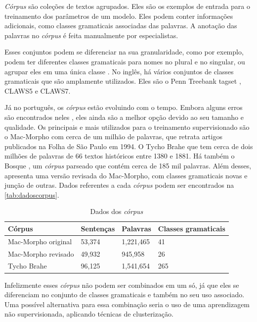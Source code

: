 \textit{Córpus} são coleções de textos agrupados. Eles são os exemplos de entrada para o treinamento dos parâmetros de um modelo. Eles podem conter informações adicionais, como classes gramaticais associadas das palavras. A anotação das palavras no \textit{córpus} é feita manualmente por especialistas.

Esses conjuntos podem se diferenciar na sua granularidade, como por exemplo, podem ter diferentes classes gramaticais para nomes no plural e no singular, ou agrupar eles em uma única classe \cite{fonseca2015evaluating}. No inglês, há vários conjuntos de classes gramaticais que são amplamente utilizados. Eles são o Penn Treebank tagset \cite{penntreebank}, CLAWS5 e CLAWS7.

Já no português, os \textit{córpus} estão evoluindo com o tempo. Embora alguns erros são encontrados neles \cite{fonseca2013mac}, eles ainda são a melhor opção devido ao seu tamanho e qualidade. Os principais e mais utilizados para o treinamento supervisionado são o Mac-Morpho \cite{aluisio2003account} com cerca de um milhão de palavras, que retrata artigos publicados na Folha de São Paulo em 1994. O Tycho Brahe \cite{tychobrahe2010corpus} que tem cerca de dois milhões de palavras de 66 textos históricos entre 1380 e 1881. Há também o Bosque \cite{afonso2002floresta}, um \textit{córpus} parseado que contém cerca de 185 mil palavras. Além desses, \cite{fonseca2015evaluating} apresenta uma versão revisada do Mac-Morpho, com classes gramaticais novas e junção de outras. Dados referentes a cada \textit{córpus} podem ser encontrados na \autoref{tab:dadoscorpus}.

\begin{table}[!htb]
\footnotesize
\centering
\caption{Dados dos \textit{córpus}}
\label{tab:dadoscorpus}
\begin{tabular}{m{4cm}m{2cm}m{2cm}m{4cm}}
  \toprule
  \textbf{Córpus} & \textbf{Sentenças}  & \textbf{Palavras}  & \textbf{Classes gramaticais}  \\
  \midrule
  Mac-Morpho original & 53,374 & 1,221,465 & 41  \\
  Mac-Morpho revisado & 49,932 & 945,958   & 26  \\
  Tycho Brahe         & 96,125 & 1,541,654 & 265 \\
  \bottomrule
\end{tabular}
\end{table}

Infelizmente esses \textit{córpus} não podem ser combinados em um só, já que eles se diferenciam no conjunto de classes gramaticais e também no seu uso associado. Uma possível alternativa para essa combinação seria o uso de uma aprendizagem não supervisionada, aplicando técnicas de clusterização.

